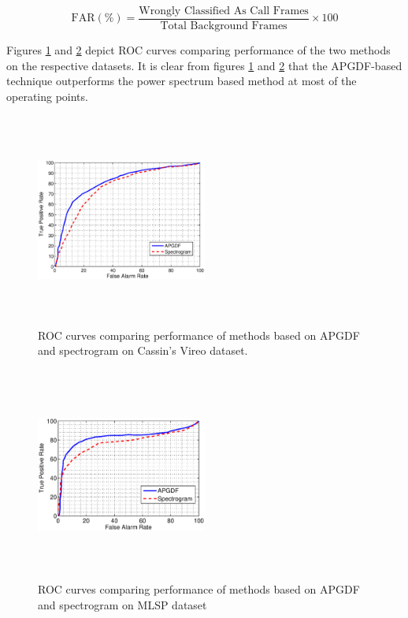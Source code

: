 \documentclass[a4paper]{article}
\begin{document}
\begin{equation}
\text{FAR} (\%)=\frac{\text{Wrongly Classified As Call Frames}} {\text{Total Background Frames}} \times 100 
\end{equation}

Figures \ref{fig:ROCdata1} and  \ref{fig:ROCdata2} depict ROC curves comparing performance of
the two methods on the respective datasets. It is clear from  figures
\ref{fig:ROCdata1} and  \ref{fig:ROCdata2} that the APGDF-based technique outperforms the power
spectrum based method at most of the  operating points.

\begin{figure}[h]
\centering
\includegraphics[width=0.5\textwidth,height=7cm]{gd1.eps}
\caption{ROC  curves  comparing  performance  of  methods based on APGDF and 
spectrogram on Cassin's Vireo dataset.}
\label{fig:ROCdata1}
\end{figure}
 
\begin{figure}[!ht]
	\centering
	\includegraphics[width=0.5\textwidth,height=7cm] {gd2.eps}
	\caption{ROC curves comparing performance of methods based on APGDF and spectrogram on MLSP dataset }   
	\label{fig:ROCdata2}
\end{figure} 
\end{document}
